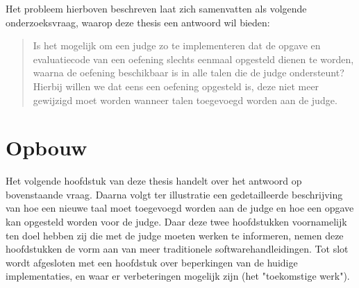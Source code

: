 Het probleem hierboven beschreven laat zich samenvatten als volgende onderzoeksvraag, waarop deze thesis een antwoord wil bieden:

\begin{quote}
    Is het mogelijk om een judge zo te implementeren dat de opgave en evaluatiecode van een oefening slechts eenmaal opgesteld dienen te worden, waarna de oefening beschikbaar is in alle talen die de judge ondersteunt?
    Hierbij willen we dat eens een oefening opgesteld is, deze niet meer gewijzigd moet worden wanneer talen toegevoegd worden aan de judge.
\end{quote}

\section{Opbouw}\label{sec:opbouw}

Het volgende hoofdstuk van deze thesis handelt over het antwoord op bovenstaande vraag.
Daarna volgt ter illustratie een gedetailleerde beschrijving van hoe een nieuwe taal moet toegevoegd worden aan de judge en hoe een opgave kan opgesteld worden voor de judge.
Daar deze twee hoofdstukken voornamelijk ten doel hebben zij die met de judge moeten werken te informeren, nemen deze hoofdstukken de vorm aan van meer traditionele softwarehandleidingen.
Tot slot wordt afgesloten met een hoofdstuk over beperkingen van de huidige implementaties, en waar er verbeteringen mogelijk zijn (het "toekomstige werk").
